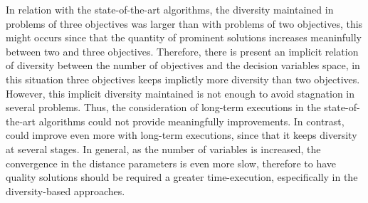 In relation with the state-of-the-art algorithms, the diversity maintained in problems of three objectives was larger than with problems of two objectives, this might occurs since that the quantity of prominent solutions increases meaninfully between two and three objectives.
%
Therefore, there is present an implicit relation of diversity between the number of objectives and the decision variables space, in this situation three objectives keeps implictly more diversity than two objectives.
%
However, this implicit diversity maintained is not enough to avoid stagnation in several problems.
%
Thus, the consideration of long-term executions in the state-of-the-art algorithms could not provide meaningfully improvements.
%
In contrast, \VSDMOEA{} could improve even more with long-term executions, since that it keeps diversity at several stages.
%
In general, as the number of variables is increased, the convergence in the distance parameters is even more slow, therefore to have quality solutions should be required a greater time-execution, especifically in the diversity-based approaches.
%

